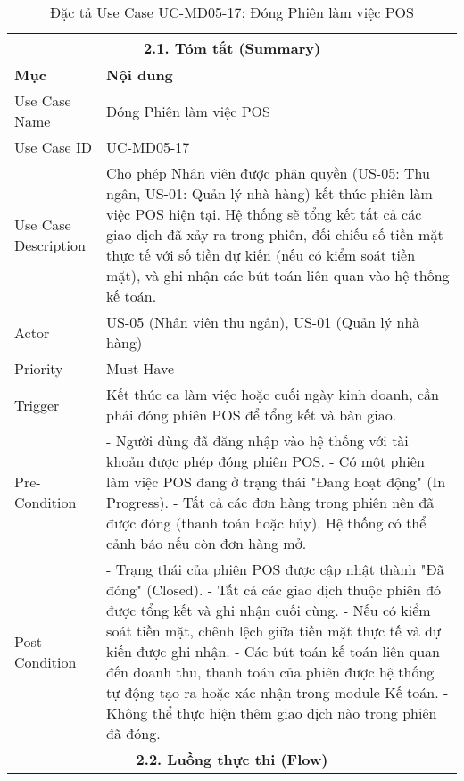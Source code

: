 \begin{longtable}{|m{4cm}|p{11cm}|}
\caption{Đặc tả Use Case UC-MD05-17: Đóng Phiên làm việc POS} \label{tab:uc_md05_17_final} \\
\hline
\multicolumn{2}{|c|}{\textbf{2.1. Tóm tắt (Summary)}} \\
\hline
\textbf{Mục} & \textbf{Nội dung} \\
\hline
\endhead %
\hline
\endfoot %
\hline
\endlastfoot %
Use Case Name & Đóng Phiên làm việc POS \\
\hline
Use Case ID & UC-MD05-17 \\
\hline
Use Case Description & Cho phép Nhân viên được phân quyền (US-05: Thu ngân, US-01: Quản lý nhà hàng) kết thúc phiên làm việc POS hiện tại. Hệ thống sẽ tổng kết tất cả các giao dịch đã xảy ra trong phiên, đối chiếu số tiền mặt thực tế với số tiền dự kiến (nếu có kiểm soát tiền mặt), và ghi nhận các bút toán liên quan vào hệ thống kế toán. \\
\hline
Actor & US-05 (Nhân viên thu ngân), US-01 (Quản lý nhà hàng) \\
\hline
Priority & Must Have \\
\hline
Trigger & Kết thúc ca làm việc hoặc cuối ngày kinh doanh, cần phải đóng phiên POS để tổng kết và bàn giao. \\
\hline
Pre-Condition & - Người dùng đã đăng nhập vào hệ thống với tài khoản được phép đóng phiên POS. \newline - Có một phiên làm việc POS đang ở trạng thái "Đang hoạt động" (In Progress). \newline - Tất cả các đơn hàng trong phiên nên đã được đóng (thanh toán hoặc hủy). Hệ thống có thể cảnh báo nếu còn đơn hàng mở. \\
\hline
Post-Condition & - Trạng thái của phiên POS được cập nhật thành "Đã đóng" (Closed). \newline - Tất cả các giao dịch thuộc phiên đó được tổng kết và ghi nhận cuối cùng. \newline - Nếu có kiểm soát tiền mặt, chênh lệch giữa tiền mặt thực tế và dự kiến được ghi nhận. \newline - Các bút toán kế toán liên quan đến doanh thu, thanh toán của phiên được hệ thống tự động tạo ra hoặc xác nhận trong module Kế toán. \newline - Không thể thực hiện thêm giao dịch nào trong phiên đã đóng. \\
\hline
\multicolumn{2}{|c|}{\textbf{2.2. Luồng thực thi (Flow)}} \\

\end{longtable}
